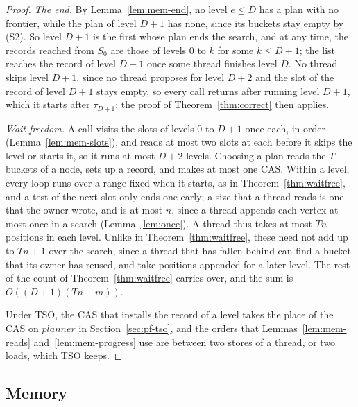 \begin{proof}
\emph{The end.} By Lemma~\ref{lem:mem-end}, no level $e \leq D$ has a plan with no frontier, while the plan of level $D+1$ has none, since its buckets stay empty by (S2). So level $D+1$ is the first whose plan ends the search, and at any time, the records reached from $S_0$ are those of levels $0$ to $k$ for some $k \leq D+1$; the list reaches the record of level $D+1$ once some thread finishes level $D$. No thread skips level $D+1$, since no thread proposes for level $D+2$ and the slot of the record of level $D+1$ stays empty, so every call returns after running level $D+1$, which it starts after $\tau_{D+1}$; the proof of Theorem~\ref{thm:correct} then applies.

\emph{Wait-freedom.} A call visits the slots of levels $0$ to $D+1$ once each, in order (Lemma~\ref{lem:mem-slots}), and reads at most two slots at each before it skips the level or starts it, so it runs at most $D+2$ levels. Choosing a plan reads the $T$ buckets of a node, sets up a record, and makes at most one CAS. Within a level, every loop runs over a range fixed when it starts, as in Theorem~\ref{thm:waitfree}, and a test of the next slot only ends one early; a size that a thread reads is one that the owner wrote, and is at most $n$, since a thread appends each vertex at most once in a search (Lemma~\ref{lem:once}). A thread thus takes at most $Tn$ positions in each level. Unlike in Theorem~\ref{thm:waitfree}, these need not add up to $Tn + 1$ over the search, since a thread that has fallen behind can find a bucket that its owner has reused, and take positions appended for a later level. The rest of the count of Theorem~\ref{thm:waitfree} carries over, and the sum is $O((D+1)(Tn + m))$.

Under TSO, the CAS that installs the record of a level takes the place of the CAS on $\mathit{planner}$ in Section~\ref{sec:pf-tso}, and the orders that Lemmas~\ref{lem:mem-reads} and~\ref{lem:mem-progress} use are between two stores of a thread, or two loads, which TSO keeps.
\end{proof}

\subsection{Memory}
\label{sec:mem-memory}

